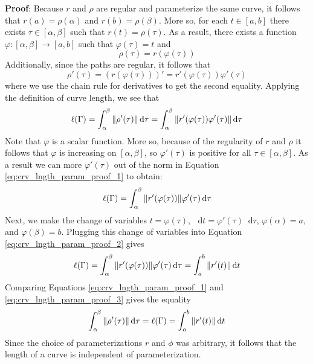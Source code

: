 \documentclass[11pt, a4paper]{article}
\newcommand{\diff}{\mathop{}\!\mathrm{d}} %
\begin{document}
\textbf{Proof}: Because $ r $ and $ \rho $ are regular and parameterize the same curve, it follows that $ r(a) = \rho(\alpha) $ and $ r(b) = \rho(\beta) $. More so, for each $ t \in [a, b] $ there exists $ \tau \in [\alpha, \beta]$ such that $ r(t) = \rho(\tau) $. As a result, there exists a function $ \varphi : [\alpha, \beta] \rightarrow [a, b] $ such that $ \varphi(\tau) = t $ and 
\begin{equation*}
	\rho(\tau) = r(\varphi(\tau))
\end{equation*}
Additionally, since the paths are regular, it follows that
\begin{equation*}
	\rho'(\tau) = \left(r(\varphi(\tau))\right)' = r'(\varphi(\tau))\varphi'(\tau)
\end{equation*}
where we use the chain rule for derivatives to get the second equality. Applying the definition of curve length, we see that 
\begin{equation}
	\ell(\Gamma) = \int_{\alpha}^{\beta} \norm{\rho'(\tau)} \diff \tau = \int_{\alpha}^{\beta} \norm{r'(\varphi(\tau))\varphi'(\tau)} \diff \tau \label{eq:crv_lngth_param_proof_1}
\end{equation}
Note that $ \varphi $ is a scalar function. More so, because of the regularity of $ r $ and $ \rho $ it follows that $ \varphi $ is increasing on $ [\alpha, \beta] $, so $ \varphi'(\tau) $ is positive for all $ \tau \in [\alpha, \beta] $. As a result we can more $ \varphi'(\tau) $ out of the norm in Equation \ref{eq:crv_lngth_param_proof_1} to obtain:
\begin{equation}
	\ell(\Gamma) = \int_{\alpha}^{\beta} \norm{r'(\varphi(\tau))} \varphi'(\tau) \diff \tau \label{eq:crv_lngth_param_proof_2}
\end{equation}
Next, we make the change of variables $ t = \varphi(\tau) $, $ \diff t = \varphi'(\tau) \diff \tau $, $ \varphi(\alpha) = a $, and $ \varphi(\beta) = b $. Plugging this change of variables into Equation \ref{eq:crv_lngth_param_proof_2} gives
\begin{equation}
	\ell(\Gamma) = \int_{\alpha}^{\beta} \norm{r'(\varphi(\tau))} \varphi'(\tau) \diff \tau = \int_{a}^{b} \norm{r'(t)} \diff t \label{eq:crv_lngth_param_proof_3}
\end{equation}
Comparing Equations \ref{eq:crv_lngth_param_proof_1} and \ref{eq:crv_lngth_param_proof_3} gives the equality
\begin{equation*}
 \int_{\alpha}^{\beta} \norm{\rho'(\tau)} \diff \tau  = \ell(\Gamma) = \int_{a}^{b} \norm{r'(t)} \diff t
\end{equation*}
Since the choice of parameterizations $ r $ and $ \phi $ was arbitrary, it follows that the length of a curve is independent of parameterization.
\end{document}
